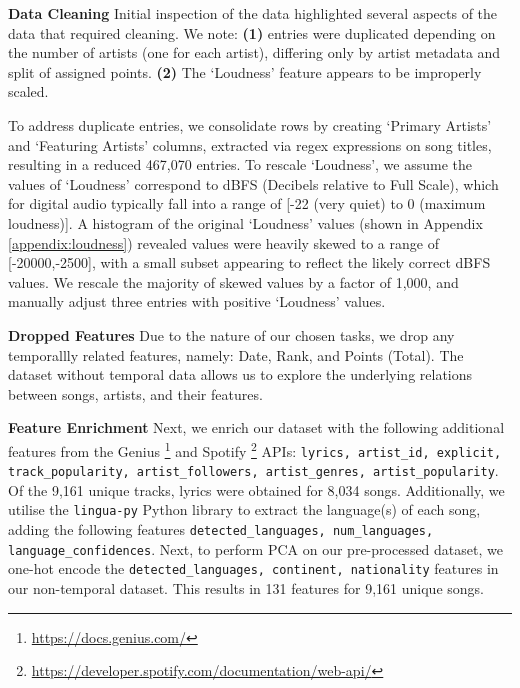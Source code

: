 \documentclass{article}
\newcommand{\minisection}[1]{\textbf{#1}\quad}
\begin{document}
\minisection{Data Cleaning} Initial inspection of the data highlighted several aspects of the data that required cleaning. We note: \textbf{(1)} entries were duplicated depending on the number of artists (one for each artist), differing only by artist metadata and split of assigned points. \textbf{(2)} The `Loudness' feature appears to be improperly scaled. 

To address duplicate entries, we consolidate rows by creating `Primary Artists' and `Featuring Artists' columns, extracted via regex expressions on song titles, resulting in a reduced 467,070 entries. To rescale `Loudness', we assume the values of `Loudness' correspond to dBFS (Decibels relative to Full Scale), which for digital audio typically fall into a range of [-22 (very quiet) to 0 (maximum loudness)]. A histogram of the original `Loudness' values (shown in Appendix \ref{appendix:loudness}) revealed values were heavily skewed to a range of [-20000,-2500], with a small subset appearing to reflect the likely correct dBFS values. We rescale the majority of skewed values by a factor of 1,000, and manually adjust three entries with positive `Loudness' values.

\minisection{Dropped Features} Due to the nature of our chosen tasks, we drop any temporallly related features, namely: Date, Rank, and Points (Total). The dataset without temporal data allows us to explore the underlying relations between songs, artists, and their features.

\minisection{Feature Enrichment} Next, we enrich our dataset with the following additional features from the Genius \footnote{\url{https://docs.genius.com/}} and Spotify \footnote{\url{https://developer.spotify.com/documentation/web-api/}} APIs: \texttt{lyrics, artist\_id, explicit, track\_popularity, artist\_followers, artist\_genres, artist\_popularity}. Of the 9,161 unique tracks, lyrics were obtained for 8,034 songs. Additionally, we utilise the \texttt{lingua-py} Python library to extract the language(s) of each song, adding the following features \texttt{detected\_languages, num\_languages, language\_confidences}. Next, to perform PCA on our pre-processed dataset, we one-hot encode the \texttt{detected\_languages, continent, nationality} features in our non-temporal dataset. This results in 131 features for 9,161 unique songs. 
\end{document}
